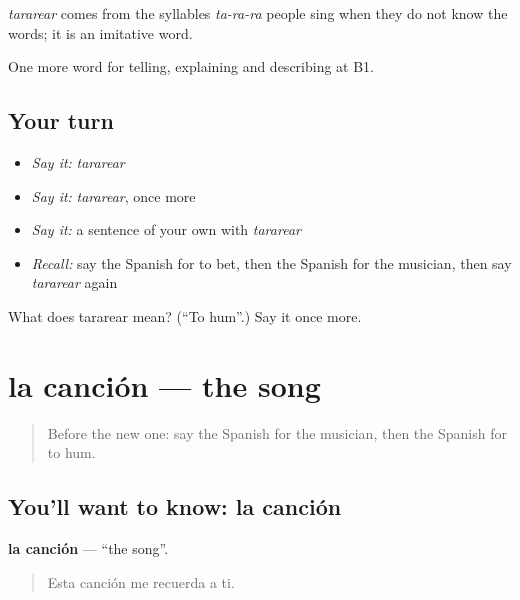 \begin{cousinweb}
\emph{tararear} comes from the syllables \emph{ta-ra-ra} people sing when they do not know the words; it is an imitative word.
\end{cousinweb}

\begin{grammarlens}[title={What you've built}]
One more word for telling, explaining and describing at B1.
\end{grammarlens}

\subsection*{Your turn}
\begin{itemize}
\raggedright
  \item \emph{Say it:} \emph{tararear}
  \item \emph{Say it:} \emph{tararear}, once more
  \item \emph{Say it:} a sentence of your own with \emph{tararear}
  \item \emph{Recall:} say the Spanish for to bet, then the Spanish for the musician, then say \emph{tararear} again
\end{itemize}

\begin{tcolorbox}[breakable,colback=teal!4,colframe=teal!35!black,title={Before you move on}]
What does tararear mean? (\textquotedblleft{}To hum\textquotedblright{}.) Say it once more.
\end{tcolorbox}
\section[la canción]{la canción — the song}

\label{lesson:ES-C753-cancion}



\begin{quote}
Before the new one: say the Spanish for the musician, then the Spanish for to hum.
\end{quote}

\subsection*{You'll want to know: la canción}
\textbf{la canción} — \textquotedblleft{}the song\textquotedblright{}.

\begin{quote}
Esta canción me recuerda a ti.
\end{quote}

